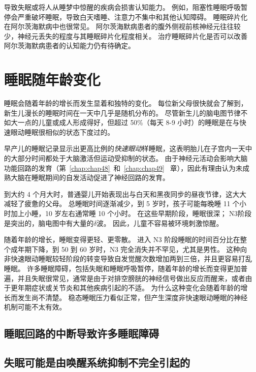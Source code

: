 导致失眠或将人从睡梦中惊醒的疾病会损害认知能力。
例如，阻塞性睡眠呼吸暂停会严重破坏睡眠，导致白天嗜睡、注意力不集中和其他认知障碍。
睡眠碎片化在阿尔茨海默病中也很常见。
阿尔茨海默病患者的腹外侧视前核神经元往往较少，神经元丢失的程度与其睡眠碎片化程度相关。
治疗睡眠碎片化是否可以改善阿尔茨海默病患者的认知能力仍有待确定。



\section{睡眠随年龄变化}

睡眠会随着年龄的增长而发生显着和独特的变化。
每位新父母很快就会了解到，新生儿漫长的睡眠时间在一天中几乎是随机分布的。
尽管新生儿的脑电图节律不如大一点的儿童或成人形成得好，但超过 50\%（每天 8-9 小时）的睡眠是在与快速眼动睡眠很相似的状态下度过的。


早产儿的睡眠记录显示出更高比例的\textit{快速眼动}样睡眠，这表明胎儿在子宫内一天中的大部分时间都处于大脑激活但运动受抑制的状态。
由于神经元活动会影响大脑功能回路的发育（第~\ref{chap:chap48}~和~\ref{chap:chap49}~ 章），因此有理由认为未成熟大脑在睡眠期间的自发活动促进了神经回路的发育。


到大约 4 个月大时，普通婴儿开始表现出与白天和黑夜同步的昼夜节律，这大大减轻了疲惫的父母。
总睡眠时间逐渐减少，到 5 岁时，孩子可能每晚睡 11 个小时加上小睡，10 岁左右通常睡 10 个小时。
在这些早期阶段，睡眠很深；
N3阶段是突出的，脑电图中有大量的$ \delta $波。
因此，儿童不容易被环境刺激惊醒。


随着年龄的增长，睡眠变得更轻、更零散。
进入 N3 阶段睡眠的时间百分比在整个成年期下降，到 50 到 60 岁时，N3 完全消失并不罕见，尤其是男性。
这种向非快速眼动睡眠较轻阶段的转变导致自发觉醒次数增加两到三倍，并且更容易打乱睡眠。
许多睡眠障碍，包括失眠和睡眠呼吸暂停，随着年龄的增长而变得更加普遍，并且失眠很常见，通常是由于对排空膀胱的神经信号做出反应而醒来，或者由于更年期症状或关节炎和其他疾病引起的不适。
为什么这种变化会随着年龄的增长而发生尚不清楚。
稳态睡眠压力看似正常，但产生深度非快速眼动睡眠的神经机制可能不太有效。



\subsection{睡眠回路的中断导致许多睡眠障碍}

\subsection{失眠可能是由唤醒系统抑制不完全引起的}

